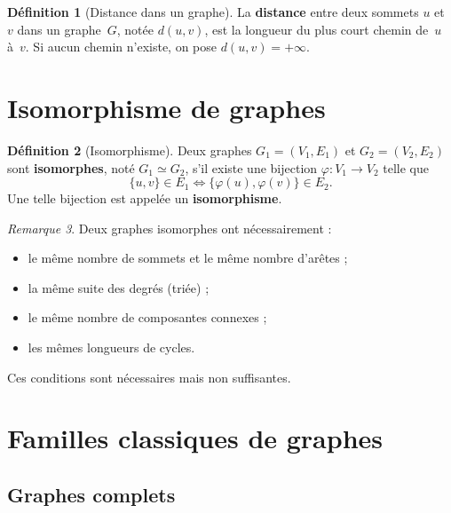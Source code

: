 \documentclass[12pt,a4paper,openany]{book}
\theoremstyle{definition}
\newtheorem{definition}{Définition}[chapter]
\theoremstyle{plain}
\theoremstyle{remark}
\newtheorem{remarque}[definition]{Remarque}
\begin{document}
\begin{definition}[Distance dans un graphe]
\label{def:distance-graphe}
La \textbf{distance} entre deux sommets $u$ et $v$ dans un graphe~$G$, notée
$d(u,v)$, est la longueur du plus court chemin de~$u$ à~$v$. Si aucun chemin
n'existe, on pose $d(u,v) = +\infty$.
\end{definition}

\section{Isomorphisme de graphes}
\label{sec:isomorphisme}

\begin{definition}[Isomorphisme]
\label{def:isomorphisme-graphe}
Deux graphes $G_1 = (V_1, E_1)$ et $G_2 = (V_2, E_2)$ sont \textbf{isomorphes},
noté $G_1 \simeq G_2$, s'il existe une bijection $\varphi \colon V_1 \to V_2$
telle que
\[
  \{u, v\} \in E_1 \iff \{\varphi(u), \varphi(v)\} \in E_2.
\]
Une telle bijection est appelée un \textbf{isomorphisme}.
\end{definition}

\begin{remarque}
Deux graphes isomorphes ont nécessairement :
\begin{itemize}
  \item le même nombre de sommets et le même nombre d'arêtes ;
  \item la même suite des degrés (triée) ;
  \item le même nombre de composantes connexes ;
  \item les mêmes longueurs de cycles.
\end{itemize}
Ces conditions sont nécessaires mais non suffisantes.
\end{remarque}

\section{Familles classiques de graphes}
\label{sec:familles}

\subsection{Graphes complets}
\label{subsec:graphe-complet}
\end{document}
